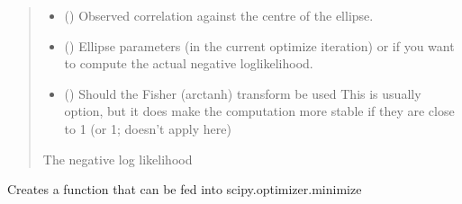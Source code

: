 \documentclass[letterpaper,10pt,english]{sphinxmanual}
\begin{document}
\begin{fulllineitems}
\begin{fulllineitems}
\begin{quote}
\begin{description}
\begin{itemize}
\item {}
\sphinxAtStartPar
{} () \textendash{} Observed correlation against the centre of the ellipse.

\item {}
\sphinxAtStartPar
{} () \textendash{} Ellipse parameters (in the current optimize iteration) or if you
want to compute the actual negative log\sphinxhyphen{}likelihood.

\item {}
\sphinxAtStartPar
{} () \textendash{} Should the Fisher (arctanh) transform be used
This is usually option, but it does make the computation
more stable if they are close to 1 (or \sphinxhyphen{}1; doesn’t apply here)

\end{itemize}

\sphinxAtStartPar
{} \textendash{} The negative log likelihood

\sphinxAtStartPar
{}

\end{description}\end{quote}

\end{fulllineitems}


\begin{fulllineitems}
\label{\detokenize{ellipse:glomar_gridding.ellipse.EllipseModel.negative_log_likelihood_function}}
\pysigstartsignatures
\pysiglinewithargsret
{}
{\sphinxparamcomma {}}
{}
\pysigstopsignatures
\sphinxAtStartPar
Creates a function that can be fed into scipy.optimizer.minimize
\begin{quote}\begin{description}
\sphinxAtStartPar
{}

\end{description}\end{quote}

\end{fulllineitems}


\end{fulllineitems}
\end{document}
